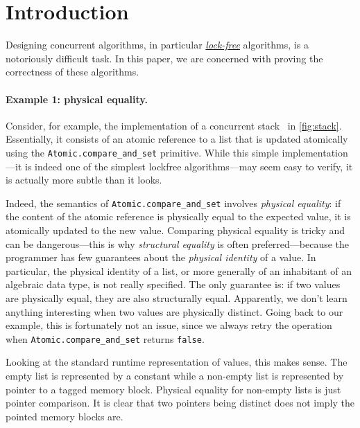 \section{Introduction}
\label{sec:introduction}

Designing concurrent algorithms, in particular \href{https://en.wikipedia.org/wiki/Non-blocking_algorithm#Lock-freedom}{\emph{lock-free}} algorithms, is a notoriously difficult task.
In this paper, we are concerned with proving the correctness of these algorithms.



\paragraph{Example 1: physical equality.}

Consider, for example, the \OCaml implementation of a concurrent stack~\cite{thomas1986systems} in \cref{fig:stack}.
Essentially, it consists of an atomic reference to a list that is updated atomically using the \texttt{Atomic.compare_and_set} primitive.
While this simple implementation---it is indeed one of the simplest lockfree algorithms---may seem easy to verify, it is actually more subtle than it looks.

Indeed, the semantics of \texttt{Atomic.compare_and_set} involves \emph{physical equality}: if the content of the atomic reference is physically equal to the expected value, it is atomically updated to the new value.
Comparing physical equality is tricky and can be dangerous---this is why \emph{structural equality} is often preferred---because the programmer has few guarantees about the \emph{physical identity} of a value.
In particular, the physical identity of a list, or more generally of an inhabitant of an algebraic data type, is not really specified.
The only guarantee is: if two values are physically equal, they are also structurally equal.
Apparently, we don't learn anything interesting when two values are physically distinct.
Going back to our example, this is fortunately not an issue, since we always retry the operation when \texttt{Atomic.compare_and_set} returns \texttt{false}.

Looking at the standard runtime representation of \OCaml values, this makes sense.
The empty list is represented by a constant while a non-empty list is represented by pointer to a tagged memory block.
Physical equality for non-empty lists is just pointer comparison.
It is clear that two pointers being distinct does not imply the pointed memory blocks are.

